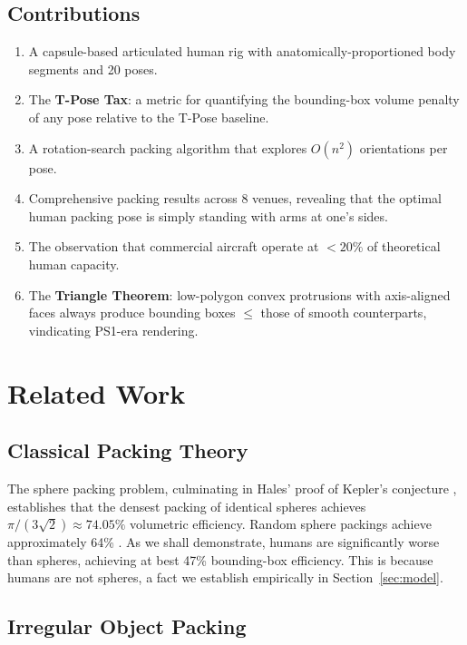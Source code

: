 \documentclass[11pt,letterpaper]{article}
\begin{document}
\subsection{Contributions}

\begin{enumerate}
    \item A capsule-based articulated human rig with anatomically-proportioned body segments and 20 poses.
    \item The \textbf{T-Pose Tax}: a metric for quantifying the bounding-box volume penalty of any pose relative to the T-Pose baseline.
    \item A rotation-search packing algorithm that explores $O(n^2)$ orientations per pose.
    \item Comprehensive packing results across 8 venues, revealing that the optimal human packing pose is simply standing with arms at one's sides.
    \item The observation that commercial aircraft operate at $<20\%$ of theoretical human capacity.
    \item The \textbf{Triangle Theorem}: low-polygon convex protrusions with axis-aligned faces always produce bounding boxes $\leq$ those of smooth counterparts, vindicating PS1-era rendering.
\end{enumerate}

\section{Related Work}

\subsection{Classical Packing Theory}

The sphere packing problem, culminating in Hales' proof of Kepler's conjecture \cite{hales2005}, establishes that the densest packing of identical spheres achieves $\pi/(3\sqrt{2}) \approx 74.05\%$ volumetric efficiency. Random sphere packings achieve approximately 64\% \cite{torquato2000}. As we shall demonstrate, humans are significantly worse than spheres, achieving at best 47\% bounding-box efficiency. This is because humans are not spheres, a fact we establish empirically in Section~\ref{sec:model}.

\subsection{Irregular Object Packing}
\end{document}
